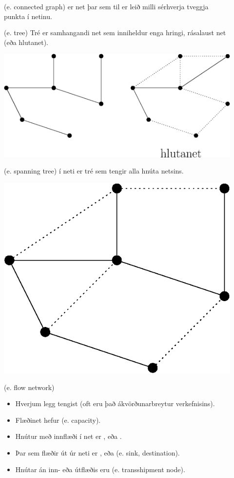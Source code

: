 \begin{description}
 \item[] (e. connected graph) er net þar sem til er leið milli sérhverja tveggja punkta í netinu.
 \item[] (e. tree) Tré er samhangandi net sem inniheldur enga hringi, rásalaust net (eða hlutanet).
 \begin{center} \includegraphics[width=0.6\columnwidth]{figs/tree.eps} \end{center}
 \item[] (e. spanning tree) í neti er tré sem tengir alla hnúta netsins. %
 \begin{center} \includegraphics[width=0.3\columnwidth]{figs/spantree.eps} \end{center}
 \item[] (e. flow network) 
 \begin{itemize}
    \item Hverjum legg tengist  (oft eru það ákvörðunarbreytur verkefnisins).
    \item Flæðinet hefur  (e. capacity).
    \item Hnútur með innflæði í net er ,  eða .
    \item Þar sem flæðir út úr neti er ,  eða  (e. sink, destination).
    \item Hnútar án inn- eða útflæðis eru  (e. transshipment node).
  \end{itemize}

\end{description}
